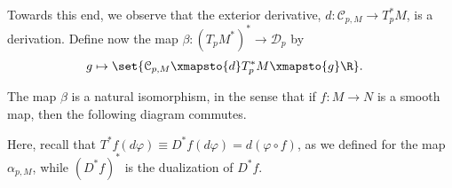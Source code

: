 \documentclass[10pt]{mypackage}
\begin{document}
Towards this end, we observe that the exterior derivative, $d\colon \mathcal{C}_{p,M}\rightarrow T_p^{\ast}M$, is a derivation. Define now the map $\beta\colon \left( T_pM^{\ast} \right)^{\ast} \rightarrow \mathcal{D}_p$ by
\begin{align*}
  g &\mapsto \set{\mathcal{C}_{p,M}\xmapsto{d} T_p^{\ast}M\xmapsto{g} \R}.
\end{align*}
\begin{proposition}
  The map $\beta$ is a natural isomorphism, in the sense that if $f\colon M\rightarrow N$ is a smooth map, then the following diagram commutes.
  \begin{center}
  \end{center}
\end{proposition}
Here, recall that $T^{\ast}f\left( d\varphi \right) \equiv D^{\ast}f\left( d\varphi \right) = d\left( \varphi\circ f \right)$, as we defined for the map $\alpha_{p,M}$, while $ \left( D^{\ast}f \right)^{\ast} $ is the dualization of $ D^{\ast}f $.\newline
\end{document}
